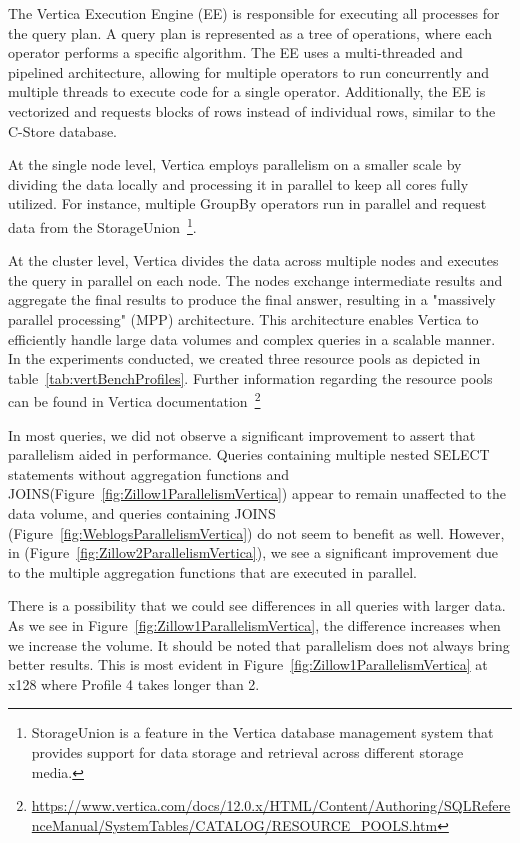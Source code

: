 The Vertica Execution Engine (EE) is responsible for executing all processes for the query plan. 
A query plan is represented as a tree of operations, where each operator performs a specific algorithm. 
The EE uses a multi-threaded and pipelined architecture, allowing for multiple operators to run 
concurrently and multiple threads to execute code for a single operator. Additionally, the EE is 
vectorized and requests blocks of rows instead of individual rows, similar to the C-Store database.

At the single node level, Vertica employs parallelism on a smaller scale by dividing the data locally 
and processing it in parallel to keep all cores fully utilized. For instance, multiple GroupBy operators 
run in parallel and request data from the StorageUnion~\footnote{StorageUnion is a feature in the Vertica 
database management system that provides support for data storage and retrieval across different storage media.}.

At the cluster level, Vertica divides the data across multiple nodes and executes the query in parallel 
on each node. The nodes exchange intermediate results and aggregate the final results to produce the 
final answer, resulting in a "massively parallel processing" (MPP) architecture. This architecture enables 
Vertica to efficiently handle large data volumes and complex queries in a scalable manner. In the experiments 
conducted, we created three resource pools as depicted in table~\ref{tab:vertBenchProfiles}. 
Further information regarding the resource pools can be found in Vertica 
documentation~\footnote{\url{https://www.vertica.com/docs/12.0.x/HTML/Content/Authoring/SQLReferenceManual/SystemTables/CATALOG/RESOURCE_POOLS.htm}}

In most queries, we did not observe a significant improvement to assert that parallelism aided in performance. 
Queries containing multiple nested SELECT statements without aggregation functions and JOINS(Figure~\ref{fig:Zillow1ParallelismVertica}) 
appear to remain unaffected to the data volume, and queries containing JOINS (Figure~\ref{fig:WeblogsParallelismVertica}) 
do not seem to benefit as well.
However, in (Figure~\ref{fig:Zillow2ParallelismVertica}), 
we see a significant improvement due to the multiple aggregation functions that are executed in parallel.

There is a possibility that we could see differences in all queries with larger data. 
As we see in Figure~\ref{fig:Zillow1ParallelismVertica}, the difference increases when we increase the volume. 
It should be noted that parallelism does not always bring better results. 
This is most evident in Figure~\ref{fig:Zillow1ParallelismVertica} at x128 where Profile 4 takes longer than 2.

